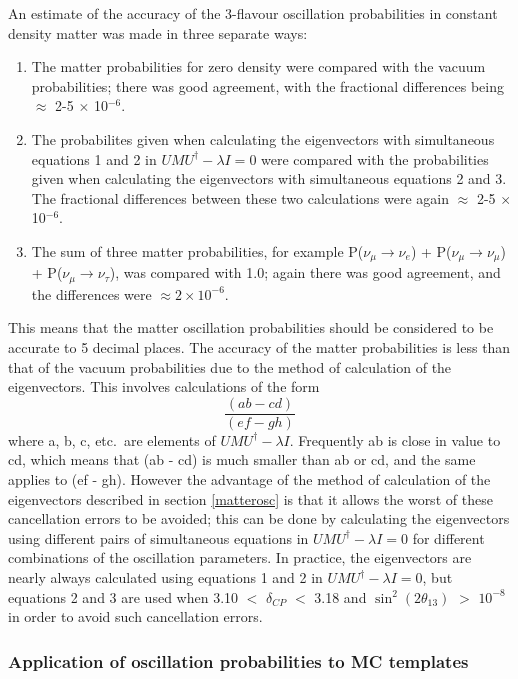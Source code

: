 An estimate of the accuracy of the 3-flavour oscillation probabilities in constant density matter was made in three separate ways:
\begin{enumerate}
\item The matter probabilities for zero density were compared with the vacuum probabilities; there was good agreement, with the fractional differences being
$\approx$ 2-5 $\times$ 10$^{-6}$.
\item The probabilites given when calculating the eigenvectors with simultaneous equations 1 and 2 in $U M U^{\dagger} - \lambda I = 0$ were compared
with the probabilities given when calculating the eigenvectors with simultaneous equations 2 and 3. The fractional differences between these two
calculations were again $\approx$ 2-5 $\times$ 10$^{-6}$.
\item The sum of three matter probabilities, for example P($\nu_{\mu} \rightarrow \nu_{e}$) + P($\nu_{\mu} \rightarrow \nu_{\mu}$) +
P($\nu_{\mu} \rightarrow \nu_{\tau}$), was compared with 1.0; again there was good agreement, and the differences were $\approx 2 \times 10^{-6}$.
\end{enumerate}

This means that the matter oscillation probabilities should be considered to be accurate to 5 decimal places. The accuracy of the matter probabilities
is less than that of the vacuum probabilities due to the method of calculation of the eigenvectors. This involves calculations of the form
\begin{displaymath}
\frac{(ab - cd)}{(ef - gh)}
\end{displaymath}
where a, b, c, etc.\ are elements of $U M U^{\dagger} - \lambda I$. Frequently ab is close in value to cd, which means that (ab - cd) is much smaller than ab or
cd, and the same applies to (ef - gh). However the advantage of the method of calculation of the eigenvectors described in section \ref{matterosc} is that it allows
the worst of these cancellation errors to be avoided; this can be done by calculating the eigenvectors using different pairs of simultaneous equations in
$U M U^{\dagger} - \lambda I = 0$ for different combinations of the oscillation parameters. In practice, the eigenvectors are nearly always calculated
using equations 1 and 2 in $U M U^{\dagger} - \lambda I = 0$, but equations 2 and 3 are used when 3.10 $<$ $\delta_{CP}$ $<$ 3.18 and
$\sin^{2}(2 \theta_{13})$ $>$ $10^{-8}$ in order to avoid such cancellation errors.  

%
%
\subsubsection*{Application of oscillation probabilities to MC templates}

